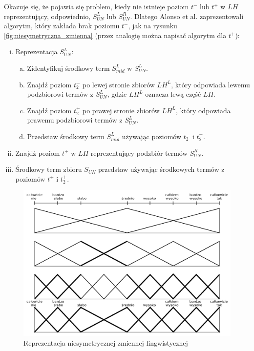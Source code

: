 Okazuje się, że pojawia się problem, kiedy nie istnieje poziom $t^-$ lub $t^+$ w
$LH$ reprezentujący, odpowiednio, $S^L_{UN}$ lub $S^R_{UN}$. Dlatego Alonso et
al. \cite{Alonso2009} zaprezentowali algorytm, który zakłada brak poziomu $t^-$,
jak na rysunku \ref{fig:niesymetryczna_zmienna} (przez analogię można napisać
algorytm dla $t^+$):
\begin{enumerate}[i.]
  \item Reprezentacja $S^L_{UN}\colon$
  \begin{enumerate}[(a)]
    \item Zidentyfikuj środkowy term $S^L_{mid}$ w $S^L_{UN}$.
    \item Znajdź poziom $t^-_2$ po lewej stronie zbiorów $LH^L$, który odpowiada
    lewemu podzbiorowi termów z $S^L_{UN}$, gdzie $LH^L$ oznacza lewą część
    $LH$.
    \item Znajdź poziom $t^+_2$ po prawej stronie zbiorów $LH^L$, który
    odpowiada prawemu podzbiorowi termów z $S^L_{UN}$.
    \item Przedstaw środkowy term $S^L_{mid}$ używając poziomów $t^-_2$ i
    $t^+_2$.
  \end{enumerate}
  \item Znajdź poziom $t^+$ w $LH$ reprezentujący podzbiór termów $S^R_{UN}$.
  \item Środkowy term zbioru $S_{UN}$ przedstaw używając środkowych termów z
  poziomów $t^+$ i $t^+_2$.
\end{enumerate}
\begin{figure}[ht]
  \includegraphics[width=\linewidth]
    {chapters/preferences/hierarchia_lingwistyczna_przyklad}
  \caption{Reprezentacja niesymetrycznej zmiennej lingwistycznej}
  \label{fig:hierarchia_lingwistyczna_przyklad}
\end{figure}
